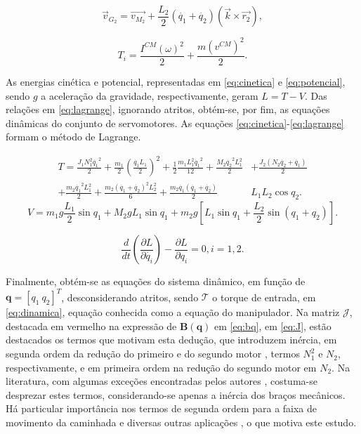 \begin{equation}
\label{eq:vg2}
\vec{v}_{G_2} = \vec{v_{M_2}}+\frac{L_2}{2}(\dot{q_1}+\dot{q_2})(\vec{k} \times \vec{r_2}),
\end{equation}

\begin{equation}
\label{eq:encinqqer}
T_i = \frac{I^{CM} (\omega)^2}{2} + \frac{m (v^{CM})^2}{2}.
\end{equation}

As energias cinética e potencial, representadas em \eqref{eq:cinetica} e \eqref{eq:potencial}, sendo $g$ a aceleração da gravidade, respectivamente, geram $L = T-V$. Das relações em \eqref{eq:lagrange}, ignorando atritos, obtém-se, por fim, as equações dinâmicas do conjunto de servomotores. As equações \eqref{eq:cinetica}\--\eqref{eq:lagrange} formam o método de Lagrange.

\begin{equation}
\begin{aligned}
\label{eq:cinetica}
T = \frac{J_1 N_1^2 \dot{q_1}^2}{2} + \frac{m_1}{2}\left(\frac{\dot{q_1}L_1}{2}\right)^2+\frac{1}{2}\frac{m_1 L_1^2 \dot{q_1}^2}{12}+\frac{M_2 \dot{q_2}^2 L_1^2}{2}&+\frac{J_2(N_2 \dot{q_2}+\dot{q_1})}{2}\\ +\frac{m_2 \dot{q_1}^2 L_1^2}{2} + \frac{m_2 (\dot{q_1}+\dot{q_2})^2 L_2^2}{6} + \frac{m_2 \dot{q_1}(\dot{q_1}+\dot{q_2})}{2} &L_1 L_2 \cos q_2.
\end{aligned}
\end{equation}
\begin{equation}
\label{eq:potencial}
V = m_1 g \frac{L_1}{2} \sin q_1 + M_2 g L_1 \sin q_1 + m_2 g \left[L_1 \sin q_1 + \frac{L_2}{2} \sin (q_1 + q_2)\right].
\end{equation}

\begin{equation}
\label{eq:lagrange}
\frac{d}{d t}\left(\frac{\partial L}{\partial \dot{q_i}} \right) - \frac{\partial L}{\partial q_i} = 0, i = 1,2.
\end{equation}

Finalmente, obtém-se as equações do sistema dinâmico, em função de $\mathbf{q} = [q_1\ q_2]^T$, desconsiderando atritos, sendo $\mathbf{\mathcal{T}}$ o torque de entrada, em \eqref{eq:dinamica}, equação conhecida como a equação do manipulador. Na matriz $\mathcal{J}$, destacada em vermelho na expressão de $\mathbf{B(q)}$ em \eqref{eq:bq}, em \eqref{eq:J}, estão destacados os termos que motivam esta dedução, que introduzem inércia, em segunda ordem da redução do primeiro e do segundo motor , termos $N_1^2$ e $N_2$, respectivamente, e em primeira ordem na redução do segundo motor em $N_2$. Na literatura, com algumas exceções encontradas pelos autores \cite{siciliano,nasareport}, costuma-se desprezar estes termos, considerando-se apenas a inércia dos braços mecânicos. Há particular importância nos termos de segunda ordem para a faixa de movimento da caminhada \cite{tesemarcos} e diversas outras aplicações \cite{nasareport}, o que motiva este estudo. 

